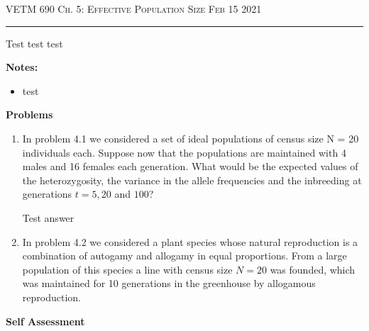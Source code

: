 \documentclass[12pt]{amsart}
\begin{document}
\thispagestyle{empty}

{\scshape VETM 690} \hfill {\scshape \Large  Ch. 5: Effective Population Size} \hfill {\scshape Feb 15 2021}
 
\medskip

\hrule

\bigskip

\bigskip

Test test test

\bigskip

{\large \bf Notes:}

\begin{itemize}
\item  test

\end{itemize}

\smallskip


\medskip

{\large \bf Problems}   
\begin{enumerate}
\item In problem 4.1 we considered a set of ideal populations of census size N = 20 individuals each. Suppose now that the populations are maintained with 4 males and 16 females each generation. What would be the expected values of the heterozygosity, the variance in the allele frequencies and the inbreeding at generations $t = 5, 20$ and $100$?

Test answer

\item In problem 4.2 we considered a plant species whose natural reproduction is a combination of autogamy and allogamy in equal proportions. From a large population of this species a line with census size $N = 20$ was founded, which was maintained for 10 generations in the greenhouse by allogamous reproduction. 
\end{enumerate}


{\large \bf Self Assessment}


\medskip
\end{document}
